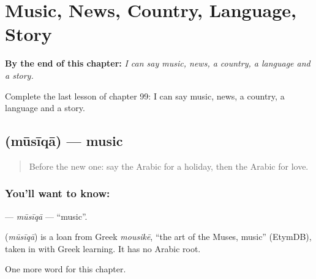 
\chapter{Music, News, Country, Language, Story}
\label{ch:ar-music-news-country-language-story}

\begin{chapteropening}
\textbf{By the end of this chapter:} \emph{I can say music, news, a country, a language and a story.}

Complete the last lesson of chapter 99: I can say music, news, a country, a language and a story.
\end{chapteropening}

\section[\texorpdfstring{\ar{موسيقى} (mūsīqā)}{موسيقى (mūsīqā)}]{ (mūsīqā) — music}

\label{lesson:AR-C99-musiqa}



\begin{quote}
Before the new one: say the Arabic for a holiday, then the Arabic for love.
\end{quote}

\subsection*{You'll want to know: }
\textbf{} — \emph{mūsīqā} — \textquotedblleft{}music\textquotedblright{}.

\begin{cousinweb}
\textbf{} (\emph{mūsīqā}) is a loan from Greek \emph{mousikē}, \textquotedblleft{}the art of the Muses, music\textquotedblright{} (EtymDB), taken in with Greek learning. It has no Arabic root.
\end{cousinweb}

\begin{grammarlens}[title={What you've built}]
One more word for this chapter.
\end{grammarlens}

